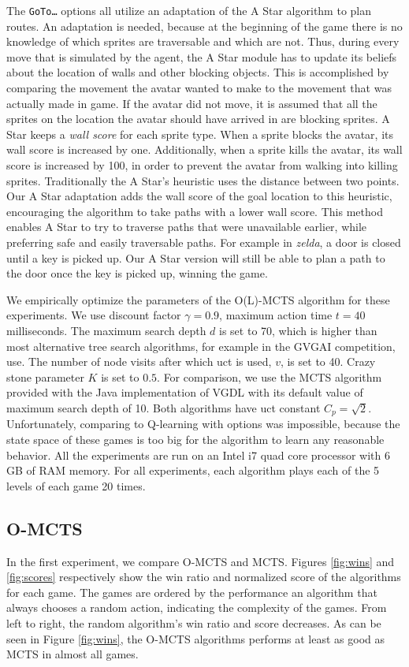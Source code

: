 The \texttt{GoTo\ldots} options all utilize an adaptation of the A Star
algorithm to plan routes. An adaptation is needed, because at the beginning of
the game there is no knowledge of which sprites are traversable and which are
not. Thus, during every move that is simulated by the agent, the A Star module
has to update its beliefs about the location of walls and other blocking
objects. This is accomplished by comparing the movement the avatar wanted to
make to the movement that was actually made in game. If the avatar did not move,
it is assumed that all the sprites on the location the avatar should have
arrived in are blocking sprites. A Star keeps a \emph{wall score} for each
sprite type. When a sprite blocks the avatar, its wall score is increased by
one. Additionally, when a sprite kills the avatar, its wall score is increased
by 100, in order to prevent the avatar from walking into killing sprites.
Traditionally the A Star's heuristic uses the distance between two points. Our A
Star adaptation adds the wall score of the goal location to this heuristic,
encouraging the algorithm to take paths with a lower wall score. This method
enables A Star to try to traverse paths that were unavailable earlier, while
preferring safe and easily traversable paths. For example in \textit{zelda}, a
door is closed until a key is picked up. Our A Star version will still be able
to plan a path to the door once the key is picked up, winning the game.

We empirically optimize the parameters of the O(L)-MCTS algorithm
for these experiments. We use discount factor $\gamma = 0.9$, maximum action
time $t = 40$ milliseconds. The maximum search depth $d$ is set to 70, which is
higher than most alternative tree search algorithms, for example in the GVGAI
competition, use. The number of node visits after which \textsf{uct} is used,
$v$, is set to 40. Crazy stone parameter $K$ is set to $0.5$.  For comparison,
we use the MCTS algorithm provided with the Java implementation of VGDL with its
default value of maximum search depth of 10. Both algorithms have \textsf{uct}
constant $C_p = \sqrt{2}$. Unfortunately, comparing to Q-learning with options
was impossible, because the state space of these games is too big for the
algorithm to learn any reasonable behavior. All the experiments are run on an
Intel i7  quad core processor with 6 GB of RAM memory. For all
experiments, each algorithm plays each of the 5 levels of each game
20 times. 

\subsection{O-MCTS}
\label{subsec:omcts}
In the first experiment, we compare O-MCTS and MCTS. Figures \ref{fig:wins} and
\ref{fig:scores} respectively show the win ratio and normalized score of the
algorithms for each game. The games are ordered by the performance an algorithm
that always chooses a random action, indicating the complexity of the games.
From left to right, the random algorithm's win ratio and score decreases. As can
be seen in Figure \ref{fig:wins}, the O-MCTS algorithms performs at least as
good as MCTS in almost all games. 

